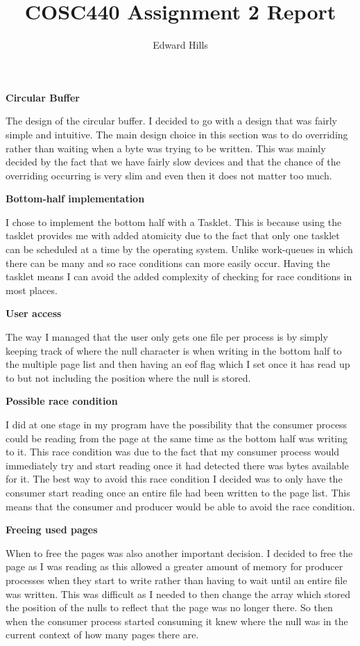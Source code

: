\documentclass[10pt]{article}
\title{COSC440 Assignment 2 Report}
\author{Edward Hills}
\begin{document}
\vspace{-1cm}

\maketitle

\textbf{Circular Buffer}

The design of the circular buffer. I decided to go with a design that was fairly simple and intuitive. The main design choice in this section was to do overriding rather than waiting when a byte was trying to be written. This was mainly decided by the fact that we have fairly slow devices and that the chance of the overriding occurring is very slim and even then it does not matter too much. 

\textbf{Bottom-half implementation}

I chose to implement the bottom half with a Tasklet. This is because using the tasklet provides me with added atomicity due to the fact that only one tasklet can be scheduled at a time by the operating system. Unlike work-queues in which there can be many and so race conditions can more easily occur. Having the tasklet means I can avoid the added complexity of checking for race conditions in most places.

\textbf{User access}

The way I managed that the user only gets one file per process is by simply keeping track of where the null character is when writing in the bottom half to the multiple page list and then having an eof flag which I set once it has read up to but not including the position where the null is stored.

\textbf{Possible race condition}

I did at one stage in my program have the possibility that the consumer process could be reading from the page at the same time as the bottom half was writing to it. This race condition was due to the fact that my consumer process would immediately try and start reading once it had detected there was bytes available for it. The best way to avoid this race condition I decided was to only have the consumer start reading once an entire file had been written to the page list. This means that the consumer and producer would be able to avoid the race condition.

\textbf{Freeing used pages}

When to free the pages was also another important decision. I decided to free the page as I was reading as this allowed a greater amount of memory for producer processes when they start to write rather than having to wait until an entire file was written. This was difficult as I needed to then change the array which stored the position of the nulls to reflect that the page was no longer there. So then when the consumer process started consuming it knew where the null was in the current context of how many pages there are.
\end{document}
